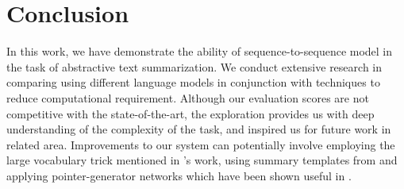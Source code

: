 \section{Conclusion}
\label{sec: conclusion}

In this work, we have demonstrate the ability of sequence-to-sequence model in the task of abstractive text summarization. We conduct extensive research in comparing using different language models in conjunction with techniques to reduce computational requirement. Although our evaluation scores are not competitive with the state-of-the-art, the exploration provides us with deep understanding of the complexity of the task, and inspired us for future work in related area. Improvements to our system can potentially involve employing the large vocabulary trick mentioned in \cite{jean2014using}'s work, using summary templates from \cite{cao2018retrieve} and applying pointer-generator networks which have been shown useful in \cite{see2017get}. 